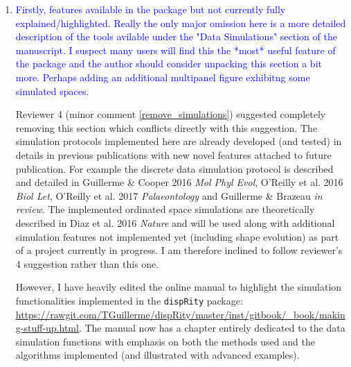 \documentclass[12pt,letterpaper]{article}
\begin{document}
\begin{enumerate}
\item{\textcolor{blue}{Firstly, features available in the package but not currently fully explained/highlighted.
Really the only major omission here is a more detailed description of the tools avilable under the "Data Simulations" section of the manuscript.
I suspect many users will find this the *most* useful feature of the package and the author should consider unpacking this section a bit more.
Perhaps adding an additional multipanel figure exhibitng some simulated spaces.}}

Reviewer 4 (minor comment \ref{remove_simulations}) suggested completely removing this section which conflicts directly with this suggestion.
The simulation protocols implemented here are already developed (and tested) in details in previous publications with new novel features attached to future publication.
For example the discrete data simulation protocol is described and detailed in Guillerme \& Cooper 2016 \textit{Mol Phyl Evol}, O’Reilly et al. 2016 \textit{Biol Let}, O'Reilly et al. 2017 \textit{Palaeontology} and Guillerme \& Brazeau \textit{in review}.
The implemented ordinated space simulations are theoretically described in Diaz et al. 2016 \textit{Nature} and will be used along with additional simulation features not implemented yet (including shape evolution) as part of a project currently in progress.
I am therefore inclined to follow reviewer's 4 suggestion rather than this one.

However, I have heavily edited the online manual to highlight the simulation functionalities implemented in the \texttt{dispRity} package: \url{https://rawgit.com/TGuillerme/dispRity/master/inst/gitbook/_book/making-stuff-up.html}.
The manual now has a chapter entirely dedicated to the data simulation functions with emphasis on both the methods used and the algorithms implemented (and illustrated with advanced examples).


\end{enumerate}
\end{document}

